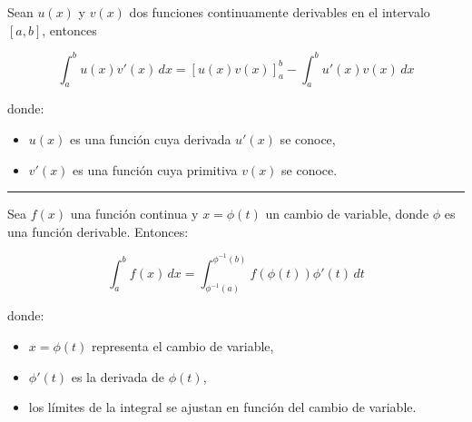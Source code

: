 \begin{f}  
	
	Sean \( u(x) \) y \( v(x) \) dos funciones continuamente derivables en el intervalo \([a, b]\), entonces
	
	\[
	\int_a^b u(x) v'(x) \, dx = \left[ u(x) v(x) \right]_a^b - \int_a^b u'(x) v(x) \, dx
	\]
	
	donde:
	\begin {itemize}
	\item \( u(x) \) es una función cuya derivada \( u'(x) \) se conoce,
	\item \( v'(x) \) es una función cuya primitiva \( v(x) \) se conoce.
\end{itemize}

\end{f}
\hrule
\begin{f} 

Sea \( f(x) \) una función continua y \( x = \phi(t) \) un cambio de variable, donde \( \phi \) es una función derivable. Entonces:

\[
\int_{a}^{b} f(x) \, dx = \int_{\phi^{-1}(a)}^{\phi^{-1}(b)} f(\phi(t)) \phi'(t) \, dt
\]

donde:
\begin{itemize}
	\item \( x = \phi(t) \) representa el cambio de variable,
	\item \( \phi'(t) \) es la derivada de \( \phi(t) \),
	\item los límites de la integral se ajustan en función del cambio de variable.
\end{itemize}
\end{f}

